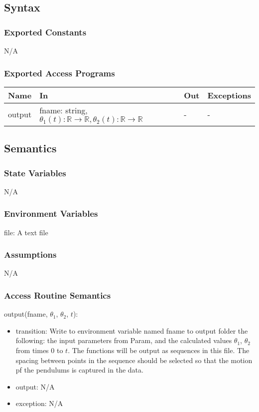 \documentclass[12pt, titlepage]{article}
\begin{document}
\subsection{Syntax}

\subsubsection{Exported Constants}
N/A
\subsubsection{Exported Access Programs}

\begin{center}
\begin{tabular}{p{3cm} p{7cm} p{2cm} p{2cm}}
\hline
\textbf{Name} & \textbf{In} & \textbf{Out} & \textbf{Exceptions} \\
\hline
output & fname: string, $\theta_1(t):\mathbb{R} \rightarrow \mathbb{R},
                 \theta_2(t):\mathbb{R} \rightarrow \mathbb{R}$ & - & - \\
\hline
\end{tabular}
\end{center}

\subsection{Semantics}

\subsubsection{State Variables}
N/A

\subsubsection{Environment Variables}

file: A text file
\subsubsection{Assumptions}

N/A
\subsubsection{Access Routine Semantics}

\noindent output(fname, $\theta_1$, $\theta_2$, $t$):
\begin{itemize}
\item transition:  Write to environment variable named fname to output folder the following: the input
    parameters from Param, and the calculated values $\theta_1$, $\theta_2$ from times $0$ to $t$.  The functions will be output as
    sequences in this file.  The spacing between points in the sequence should
    be selected so that the motion pf the pendulums is captured in the data.
\item output: N/A
\item exception: N/A
\end{itemize}
\end{document}
